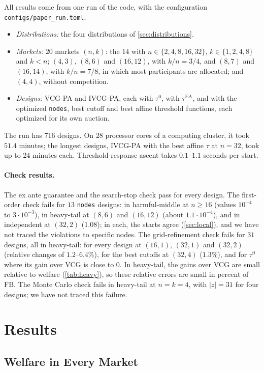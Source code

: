 \documentclass[11pt]{article}
\newcommand{\FB}{\mathrm{FB}}
\newcommand{\tauea}{\tau^{\mathrm{EA}}}
\newcommand{\code}[1]{\texttt{#1}}
\begin{document}
All results come from one run of the code, with the configuration \code{configs/paper\_run.toml}.
\begin{itemize}
    \item \emph{Distributions:} the four distributions of \cref{sec:distributions}.
    \item \emph{Markets:} $20$ markets $(n,k)$: the $14$ with $n\in\{2,4,8,16,32\}$, $k\in\{1,2,4,8\}$ and $k<n$; $(4,3)$, $(8,6)$ and $(16,12)$, with $k/n=3/4$, and $(8,7)$ and $(16,14)$, with $k/n=7/8$, in which most participants are allocated; and $(4,4)$, without competition.
    \item \emph{Designs:} VCG-PA and IVCG-PA, each with $\tau^0$, with $\tauea$, and with the optimized \code{nodes}, best cutoff and best affine threshold functions, each optimized for its own auction.
\end{itemize}
The run has $716$ designs. On $28$ processor cores of a computing cluster, it took $51.4$ minutes; the longest designs, IVCG-PA with the best affine $\tau$ at $n=32$, took up to $24$ minutes each. Threshold-response ascent takes $0.1$--$1.1$ seconds per start.

\paragraph{Check results.} The ex ante guarantee and the search-stop check pass for every design. The first-order check fails for $13$ \code{nodes} designs: in harmful-middle at $n\geq16$ (values $10^{-4}$ to $3\cdot10^{-3}$), in heavy-tail at $(8,6)$ and $(16,12)$ (about $1.1\cdot10^{-4}$), and in independent at $(32,2)$ ($1.08$); in each, the starts agree (\cref{sec:local}), and we have not traced the violations to specific nodes. The grid-refinement check fails for $31$ designs, all in heavy-tail: for every design at $(16,1)$, $(32,1)$ and $(32,2)$ (relative changes of $1.2$--$6.4\%$), for the best cutoffs at $(32,4)$ ($1.3\%$), and for $\tau^0$ where its gain over VCG is close to $0$. In heavy-tail, the gains over VCG are small relative to welfare (\cref{tab:heavy}), so these relative errors are small in percent of $\FB$. The Monte Carlo check fails in heavy-tail at $n=k=4$, with $|z|=31$ for four designs; we have not traced this failure.

\section{Results}\label{sec:results}

\subsection{Welfare in Every Market}\label{sec:welfare}
\end{document}
